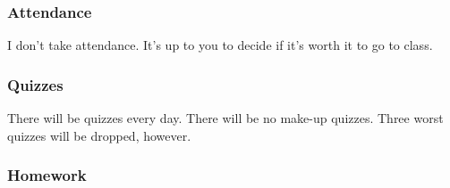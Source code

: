 \documentclass[
]{article}
\begin{document}
\subsubsection*{Attendance}\label{attendance}

I don't take attendance. It's up to you to decide if it's worth it to go to
class.

\subsubsection*{Quizzes}\label{quizzes}

There will be quizzes every day.
There will be no make-up quizzes.
Three worst quizzes will be dropped, however.

\subsubsection*{Homework}\label{homework}
\end{document}
